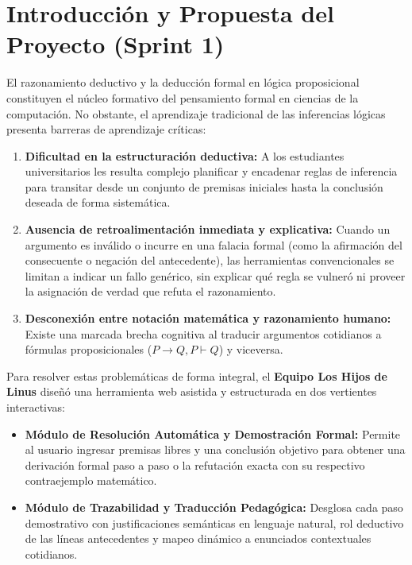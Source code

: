 \documentclass[11pt,a4paper]{article}
\begin{document}
\newpage
\section{Introducción y Propuesta del Proyecto (Sprint 1)}

El razonamiento deductivo y la deducción formal en lógica proposicional constituyen el núcleo formativo del pensamiento formal en ciencias de la computación. No obstante, el aprendizaje tradicional de las inferencias lógicas presenta barreras de aprendizaje críticas:
\begin{enumerate}[label=\alph*)]
    \item \textbf{Dificultad en la estructuración deductiva:} A los estudiantes universitarios les resulta complejo planificar y encadenar reglas de inferencia para transitar desde un conjunto de premisas iniciales hasta la conclusión deseada de forma sistemática.
    \item \textbf{Ausencia de retroalimentación inmediata y explicativa:} Cuando un argumento es inválido o incurre en una falacia formal (como la afirmación del consecuente o negación del antecedente), las herramientas convencionales se limitan a indicar un fallo genérico, sin explicar qué regla se vulneró ni proveer la asignación de verdad que refuta el razonamiento.
    \item \textbf{Desconexión entre notación matemática y razonamiento humano:} Existe una marcada brecha cognitiva al traducir argumentos cotidianos a fórmulas proposicionales ($P \to Q, P \vdash Q$) y viceversa.
\end{enumerate}

Para resolver estas problemáticas de forma integral, el \textbf{Equipo Los Hijos de Linus} diseñó una herramienta web asistida y estructurada en dos vertientes interactivas:

\begin{itemize}[leftmargin=1.5cm]
    \item \textbf{Módulo de Resolución Automática y Demostración Formal:} Permite al usuario ingresar premisas libres y una conclusión objetivo para obtener una derivación formal paso a paso o la refutación exacta con su respectivo contraejemplo matemático.
    \item \textbf{Módulo de Trazabilidad y Traducción Pedagógica:} Desglosa cada paso demostrativo con justificaciones semánticas en lenguaje natural, rol deductivo de las líneas antecedentes y mapeo dinámico a enunciados contextuales cotidianos.
\end{itemize}
\end{document}
